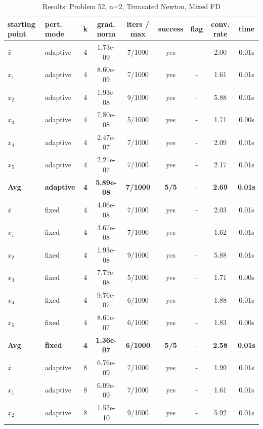 \begin{longtable}{|l|l|c|c|c|c|c|c|c|}
\caption{Results: Problem 52, n=2, Truncated Newton, Mixed FD} \\
\hline
\textbf{starting point} & \textbf{pert. mode} & \textbf{k} & \textbf{grad. norm} & \textbf{iters / max} & \textbf{success} & \textbf{flag} & \textbf{conv. rate} & \textbf{time} \\
\hline
\endfirsthead
\endhead
\endfoot
\hline
\endlastfoot
$\bar{x}$ & adaptive & 4 & 1.73e-09 & 7/1000 & yes & - & 2.00 & 0.01s \\
\hline
$x_1$ & adaptive & 4 & 8.60e-09 & 7/1000 & yes & - & 1.61 & 0.01s \\
\hline
$x_2$ & adaptive & 4 & 1.93e-08 & 9/1000 & yes & - & 5.88 & 0.01s \\
\hline
$x_3$ & adaptive & 4 & 7.80e-08 & 5/1000 & yes & - & 1.71 & 0.00s \\
\hline
$x_4$ & adaptive & 4 & 2.47e-07 & 7/1000 & yes & - & 2.09 & 0.01s \\
\hline
$x_5$ & adaptive & 4 & 2.21e-07 & 7/1000 & yes & - & 2.17 & 0.01s \\
\hline
\hline\hline
\textbf{Avg} & \textbf{adaptive} & \textbf{4} & \textbf{5.89e-08} & \textbf{7/1000} & \textbf{5/5} & - & \textbf{2.69} & \textbf{0.01s} \\
\hline\hline
\hline
$\bar{x}$ & fixed & 4 & 4.06e-08 & 7/1000 & yes & - & 2.03 & 0.01s \\
\hline
$x_1$ & fixed & 4 & 3.67e-08 & 7/1000 & yes & - & 1.62 & 0.01s \\
\hline
$x_2$ & fixed & 4 & 1.93e-08 & 9/1000 & yes & - & 5.88 & 0.01s \\
\hline
$x_3$ & fixed & 4 & 7.79e-08 & 5/1000 & yes & - & 1.71 & 0.00s \\
\hline
$x_4$ & fixed & 4 & 9.76e-07 & 6/1000 & yes & - & 1.88 & 0.01s \\
\hline
$x_5$ & fixed & 4 & 8.61e-07 & 6/1000 & yes & - & 1.83 & 0.00s \\
\hline
\hline\hline
\textbf{Avg} & \textbf{fixed} & \textbf{4} & \textbf{1.36e-07} & \textbf{6/1000} & \textbf{5/5} & - & \textbf{2.58} & \textbf{0.01s} \\
\hline\hline
$\bar{x}$ & adaptive & 8 & 6.76e-09 & 7/1000 & yes & - & 1.99 & 0.01s \\
\hline
$x_1$ & adaptive & 8 & 6.09e-09 & 7/1000 & yes & - & 1.61 & 0.01s \\
\hline
$x_2$ & adaptive & 8 & 1.52e-10 & 9/1000 & yes & - & 5.92 & 0.01s \\

\end{longtable}
